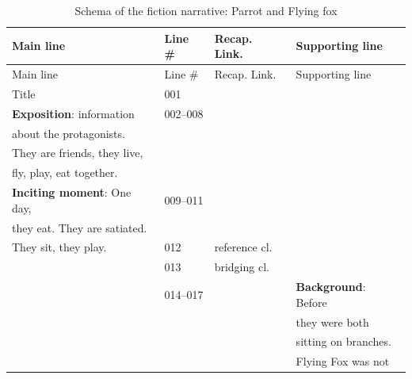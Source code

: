 \documentclass[output=paper]{LSP/langsci}
\begin{document}
{\footnotesize%
\begin{longtable}{llll}
\caption{Schema of the fiction narrative: Parrot and Flying fox\label{GuTable4}}\\
\lsptoprule
{Main line}                             & {Line \#} &   {Recap. Link.}      & {Supporting line}   \\\midrule\endfirsthead
\midrule
{Main line}                             & {Line \#} &   {Recap. Link.}      & {Supporting line}   \\\midrule\endhead\lspbottomrule\endlastfoot
  Title                                            & 001               &               &               \\
\textbf{Exposition}: information                 & 002--008          &                 &                  \\
about the protagonists.                        &                    &                 &                       \\
They are friends, they live,                     &                   &                 &                          \\
 fly, play, eat together.                       &                    &                 &                             \\
\textbf{Inciting moment}: One day,         & 009--011               &                 &                           \\
they eat. They are satiated.                               &                &                 &                            \\
They sit, they play.                          & 012               &    reference cl.             &                                \\
                                            & 013                 & bridging cl. &                           \\
                                            & 014--017          &                 & \textbf{Background}: Before      \\
                                                 &                   &                 & they were both   \\                          
                                                   &                   &                 & sitting on branches.  \\
                                                &                   &                 & Flying Fox  was not            \\          

\end{longtable}}
\end{document}
